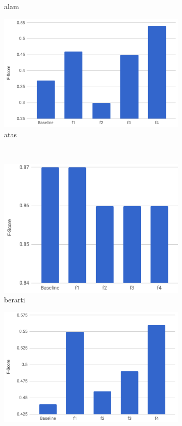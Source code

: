 \begin{figure}[H]
\begin{subfigure}{.5\textwidth}
		\caption{alam}
	\end{subfigure}%
	\begin{subfigure}{.5\textwidth}
		\centering
		\includegraphics[width=1\linewidth]{adit_pics/atas.png}
		\caption{atas}
	\end{subfigure}%
	\\
	\begin{subfigure}{.5\textwidth}
		\centering
		\includegraphics[width=1\linewidth]{adit_pics/berarti.png}
		\caption{berarti}
	\end{subfigure}%
	\begin{subfigure}{.5\textwidth}
		\centering
		\includegraphics[width=1\linewidth]{adit_pics/bidang.png}

\end{subfigure}
\end{figure}
